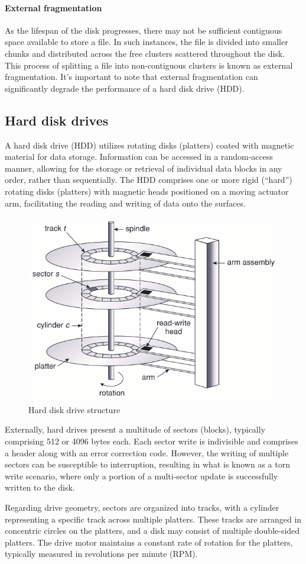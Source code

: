 \paragraph*{External fragmentation}
As the lifespan of the disk progresses, there may not be sufficient contiguous space available to store a file. 
In such instances, the file is divided into smaller chunks and distributed across the free clusters scattered throughout the disk. 
This process of splitting a file into non-contiguous clusters is known as external fragmentation. 
It's important to note that external fragmentation can significantly degrade the performance of a hard disk drive (HDD).

\subsection{Hard disk drives}
A hard disk drive (HDD) utilizes rotating disks (platters) coated with magnetic material for data storage. 
Information can be accessed in a random-access manner, allowing for the storage or retrieval of individual data blocks in any order, rather than sequentially. 
The HDD comprises one or more rigid (``hard'') rotating disks (platters) with magnetic heads positioned on a moving actuator arm, facilitating the reading and writing of data onto the surfaces.
\begin{figure}[H]
    \centering
    \includegraphics[width=0.5\linewidth]{images/hdds.png}
    \caption{Hard disk drive structure}
\end{figure}
Externally, hard drives present a multitude of sectors (blocks), typically comprising 512 or 4096 bytes each. 
Each sector write is indivisible and comprises a header along with an error correction code. 
However, the writing of multiple sectors can be susceptible to interruption, resulting in what is known as a torn write scenario, where only a portion of a multi-sector update is successfully written to the disk.

Regarding drive geometry, sectors are organized into tracks, with a cylinder representing a specific track across multiple platters. 
These tracks are arranged in concentric circles on the platters, and a disk may consist of multiple double-sided platters.
The drive motor maintains a constant rate of rotation for the platters, typically measured in revolutions per minute (RPM).

